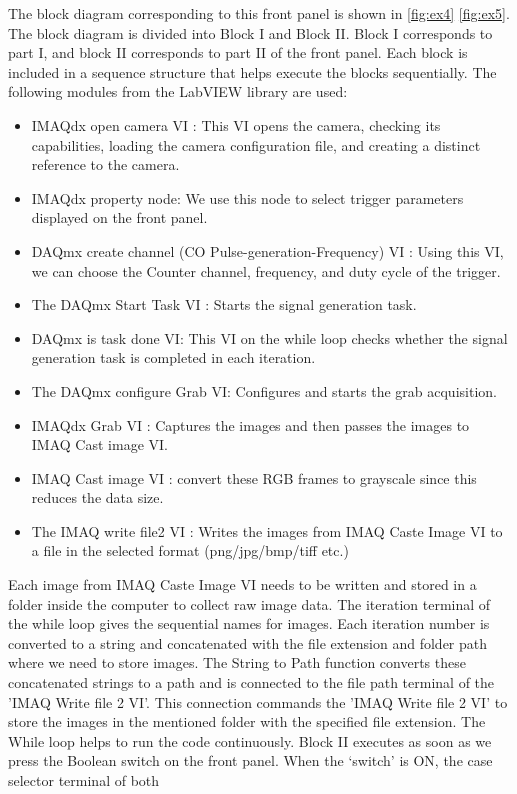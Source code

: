 \documentclass[journal=jacsat,manuscript=article]{achemso}
\begin{document}
The block diagram corresponding to this front panel is shown in \ref{fig:ex4} \ref{fig:ex5}. The block diagram is divided into Block I and Block II. Block I corresponds to part I, and block II corresponds to part II of the front panel. Each block is included in a sequence structure that helps execute the blocks sequentially. 
The following modules from the LabVIEW library are used:
\begin{itemize}
	\item IMAQdx open camera VI : This VI opens the camera, checking its capabilities, loading the camera configuration file, and creating a distinct reference to the camera. 
	\item IMAQdx property node: We use this node to select trigger parameters displayed on the front panel.
	\item DAQmx create channel (CO Pulse-generation-Frequency) VI : Using this VI, we can choose the Counter channel, frequency, and duty cycle of the trigger.
	\item The DAQmx Start Task VI : Starts the signal generation task.
	\item DAQmx is task done VI: This VI  on the while loop checks whether the signal generation task is completed in each iteration.
	\item The DAQmx configure Grab VI: Configures and starts the grab acquisition.
	\item IMAQdx Grab VI : Captures the images and then passes the images to IMAQ Cast image VI.
	\item IMAQ Cast image VI : convert these RGB frames to grayscale since this reduces the data size.
	\item The IMAQ write file2 VI : Writes the images from IMAQ Caste Image VI to a file in the selected format (png/jpg/bmp/tiff etc.) 
\end{itemize}
Each image from IMAQ Caste Image VI needs to be written and stored in a folder inside the computer to collect raw image data.  The iteration terminal of the while loop gives the sequential names for images. Each iteration number is converted to a string and concatenated with the file extension and folder path where we need to store images. The String to Path function converts these concatenated strings to a path and is connected to the file path terminal of the 'IMAQ Write file 2 VI'. This connection commands the 'IMAQ Write file 2 VI' to store the images in the mentioned folder with the specified file extension. The While loop helps to run the code continuously. Block II executes as soon as we press the Boolean switch on the front panel. When the ‘switch’ is ON, the case selector terminal of both
\end{document}
